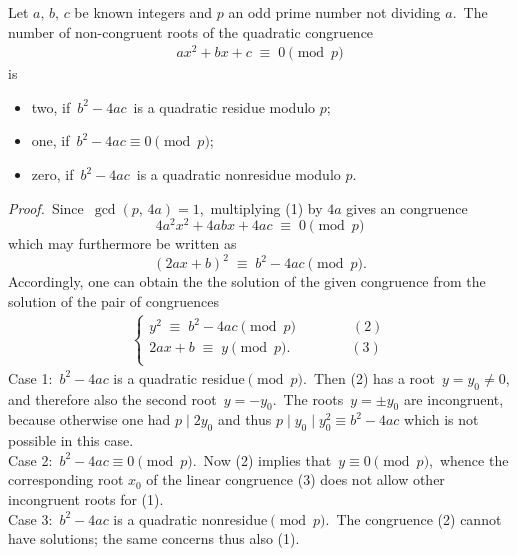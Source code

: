 \documentclass[12pt]{article}
\theoremstyle{definition}
\begin{document}
 
Let $a,\,b,\,c$ be known integers and $p$ an odd prime number not dividing $a$.\, The number of non-congruent roots of the quadratic congruence
\begin{align}
               ax^2\!+\!bx\!+\!c \;\equiv\; 0 \pmod{p}
\end{align}
is
\begin{itemize}
\item two, if\, $b^2\!-\!4ac$\, is a quadratic residue modulo $p$;
\item one, if\, $b^2\!-\!4ac \equiv 0 \pmod{p}$;
\item zero, if\, $b^2\!-\!4ac$\, is a quadratic nonresidue modulo $p$.\\
\end{itemize}



{\em Proof.}\, Since\, $\gcd(p,\,4a) = 1$,\, multiplying (1) by $4a$ gives an  congruence
$$4a^2x^2\!+\!4abx\!+\!4ac \;\equiv\; 0 \pmod{p}$$
which may furthermore be written as
$$(2ax\!+\!b)^2 \;\equiv\; b^2\!-\!4ac \pmod{p}.$$
Accordingly, one can obtain the the solution of the given congruence from the solution of the pair of congruences
\begin{align*}
\begin{cases}
               y^2 \;\equiv\; b^2\!-\!4ac \pmod{p} \qquad\qquad (2)\\
               2ax\!+\!b \;\equiv\; y \pmod{p}.\; \qquad\qquad (3) \\
\end{cases}
\end{align*}
Case 1:\, $b^2\!-\!4ac$ is a quadratic residue$\pmod{p}$.\, Then (2) has a root \,$y = y_0 \neq 0$,\, and therefore also the second root\, $y = -y_0$.\, The roots\, $y = \pm y_0$ are incongruent, because otherwise one had\; 
$p \mid 2y_0$\; and thus\; $p \mid y_0 \mid y_0^2 \equiv b^2\!-\!4ac$\; which is not possible in this case.\\
Case 2:\, $b^2\!-\!4ac \equiv 0 \pmod{p}$.\, Now (2) implies that\, $y \equiv 0 \pmod{p}$,\, whence the corresponding root $x_0$ of the linear congruence (3) does not allow other incongruent roots for (1).\\
Case 3:\, $b^2\!-\!4ac$ is a quadratic nonresidue$\pmod{p}$.\, The congruence (2) cannot have solutions; the same concerns thus also (1).\\
\end{document}
